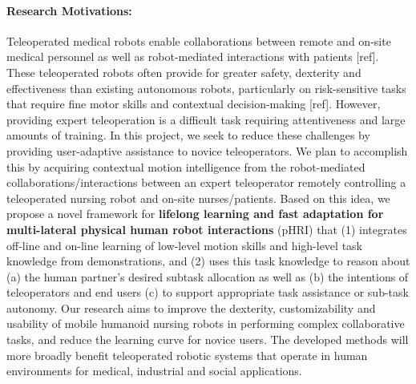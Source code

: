 \documentclass[letterpaper, 11 pt, onecolumn]{article}
\begin{document}
\paragraph*{Research Motivations:} 
Teleoperated medical robots enable collaborations between remote and on-site medical personnel as well as robot-mediated interactions with patients [ref]. These teleoperated robots often provide for greater safety, dexterity and effectiveness than existing autonomous robots, particularly on risk-sensitive tasks that require fine motor skills and contextual decision-making [ref]. 
However, providing expert teleoperation is a difficult task requiring attentiveness and large amounts of training.
In this project, we seek to reduce these challenges by providing user-adaptive assistance to novice teleoperators.
We plan to accomplish this by acquiring contextual motion intelligence from the robot-mediated collaborations/interactions between an expert teleoperator remotely controlling a teleoperated nursing robot and on-site nurses/patients.
Based on this idea, we propose a novel framework for \textbf{lifelong learning and fast adaptation for multi-lateral physical human robot interactions} (pHRI) that (1) integrates off-line and on-line learning of low-level motion skills and high-level task knowledge from demonstrations, and (2) uses this task knowledge to reason about (a) the human partner's desired subtask allocation as well as (b) the intentions of teleoperators and end users (c) to support appropriate task assistance or sub-task autonomy. Our research aims to improve the dexterity, customizability and usability of mobile humanoid nursing robots in performing complex collaborative tasks, and reduce the learning curve for novice users. The developed methods will more broadly benefit teleoperated robotic systems that operate in human environments for medical, industrial and social applications. 

\end{document}
